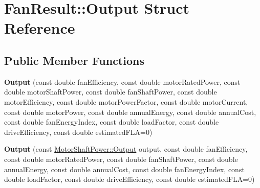 \hypertarget{struct_fan_result_1_1_output}{}\section{Fan\+Result\+:\+:Output Struct Reference}
\label{struct_fan_result_1_1_output}
\subsection*{Public Member Functions}
\begin{DoxyCompactItemize}
\item 
\mbox{\label{struct_fan_result_1_1_output_a557a94bc157a5e71cd8e57b5bdf6c1e7}} 
{\bfseries Output} (const double fan\+Efficiency, const double motor\+Rated\+Power, const double motor\+Shaft\+Power, const double fan\+Shaft\+Power, const double motor\+Efficiency, const double motor\+Power\+Factor, const double motor\+Current, const double motor\+Power, const double annual\+Energy, const double annual\+Cost, const double fan\+Energy\+Index, const double load\+Factor, const double drive\+Efficiency, const double estimated\+F\+LA=0)
\item 
\mbox{\label{struct_fan_result_1_1_output_a1f99eb8da726ccb297ae40d77b461de0}} 
{\bfseries Output} (const \hyperlink{struct_motor_shaft_power_1_1_output}{Motor\+Shaft\+Power\+::\+Output} output, const double fan\+Efficiency, const double motor\+Rated\+Power, const double fan\+Shaft\+Power, const double annual\+Energy, const double annual\+Cost, const double fan\+Energy\+Index, const double load\+Factor, const double drive\+Efficiency, const double estimated\+F\+LA=0)
\end{DoxyCompactItemize}
